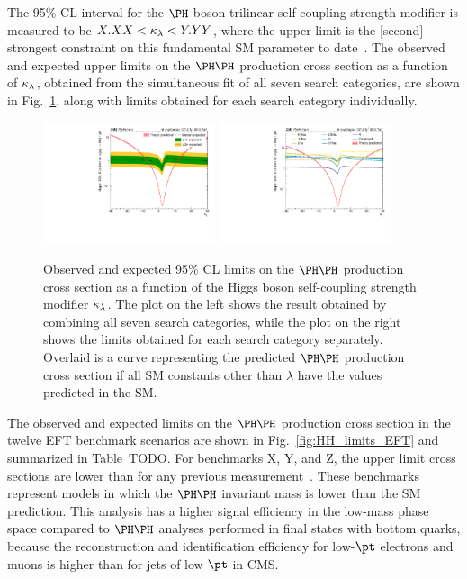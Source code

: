 The 95\% CL interval for the $\PHiggs$ boson trilinear self-coupling strength modifier
is measured to be $X.XX < \kappa_{\lambda} < Y.YY$, where the upper limit is the [second]
strongest constraint on this fundamental SM parameter to date~\cite{Sirunyan:2745738,Sirunyan:2018ayu,2020135103}.
The observed and expected upper limits on the $\HH$ production cross section as a function of
$\kappa_{\lambda}$, obtained from the simultaneous fit of all seven search categories, are shown in Fig.~\ref{fig:HH_limits_kLambda}, 
along with limits obtained for each search category individually.

\begin{figure}
  \centering
  \includegraphics[width=0.45\textwidth]{figures/klscan.pdf}
  \hspace{0.05\textwidth}
  \includegraphics[width=0.45\textwidth]{figures/klMultiscan.pdf}
  \caption{
    Observed and expected 95\% CL limits on the $\HH$ production cross section as
    a function of the Higgs boson self-coupling strength modifier $\kappa_{\lambda}$.
    The plot on the left shows the result obtained by combining all seven search categories,
    while the plot on the right shows the limits obtained for each search category separately.  Overlaid is a curve representing the
    predicted $\HH$ production cross section if all SM constants other than
    $\lambda$ have the values predicted in the SM.
  }
  \label{fig:HH_limits_kLambda}
\end{figure}

The observed and expected limits on the $\HH$ production cross section in the
twelve EFT benchmark scenarios are shown in Fig.~\ref{fig:HH_limits_EFT}
and summarized in Table~TODO.
For benchmarks X, Y, and Z, the upper limit cross sections are lower
than for any previous measurement~\cite{Sirunyan:2745738}.
These benchmarks represent models in which the $\HH$ invariant mass is
lower than the SM prediction.  This analysis has a higher signal efficiency
in the low-mass phase space compared to $\HH$ analyses performed in final states with bottom quarks,
because the reconstruction and identification efficiency for low-$\pt$ electrons and muons is higher than for jets of low $\pt$ in CMS.


